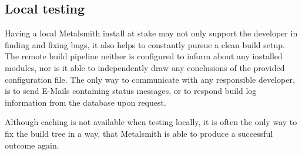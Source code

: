 \subsection{Local testing}
Having a local Metalsmith install at stake may not only support the developer in finding and fixing bugs, it also helps to constantly pursue a clean build setup. The remote build pipeline neither is configured to inform about any installed modules, nor is it able to independently draw any conclusions of the provided configuration file. The only way to communicate with any responsible developer, is to send E-Mails containing status messages, or to respond build log information from the database upon request.

Although caching is not available when testing locally, it is often the only way to fix the build tree in a way, that Metalsmith is able to produce a successful outcome again.
